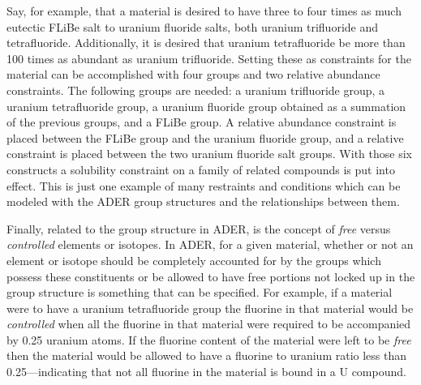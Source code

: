 Say, for example, that a material is desired to have three to four times as
much eutectic FLiBe salt to uranium fluoride salts, both 
uranium trifluoride and tetrafluoride. Additionally, it is desired that uranium
tetrafluoride be more than 100 times as abundant as uranium trifluoride. Setting
these as constraints for the material can be accomplished with four groups and
two relative abundance constraints. The following groups are needed: a uranium 
trifluoride group, a uranium tetrafluoride group, a uranium fluoride group 
obtained as a summation of the previous groups, and a FLiBe group. 
A relative abundance constraint is placed between
the FLiBe group and the uranium fluoride group, and a relative
constraint is placed between the two uranium fluoride salt groups. With those
six constructs a solubility constraint on a family of related compounds is put
into effect. This is just one example of many restraints and conditions which
can be modeled with the ADER group structures and the relationships between
them.

Finally, related to the group structure in ADER, is the concept of 
\textit{free} versus \textit{controlled} elements or isotopes. 
In ADER, for a given material, whether or not an element or isotope should be 
completely accounted for by the groups
which possess these constituents or be allowed to have free portions
not locked up in the group structure is something that can be specified. For 
example, if a material were to have a uranium tetrafluoride group the 
fluorine in that material would be \textit{controlled} when all the fluorine in
that material were required to be accompanied by 0.25 uranium atoms. If the
fluorine content of the material were left to be \textit{free} then the 
material would be allowed to have a fluorine to uranium ratio less than 
0.25---indicating that not all fluorine in the material is bound in a U 
compound.


